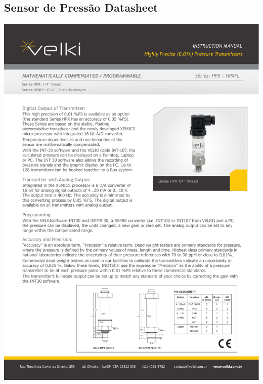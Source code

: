 \begin{appendices}
\subsection{Sensor de Pressão Datasheet}
\includegraphics[width=1\columnwidth]{figs/datasheets/profundimetro.pdf}


\end{appendices}
